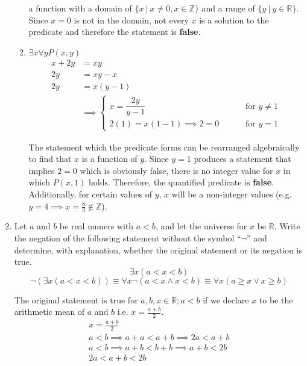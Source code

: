 \documentclass[letterpaper, 12pt]{article}
\newcommand{\keyword}[1]{\textbf{#1}}
\begin{document}
\begin{enumerate}
\begin{enumerate}
\begin{flushleft}
    a function with a domain of $\{x \: | \: x \ne 0, x \in \mathbb{Z}\}$ and a range of
    $\{y \: | \: y \in \mathbb{R}\}$. Since $x = 0$ is not in the domain, not every $x$ is a 
    solution to the predicate and therefore the statement is \keyword{false}.
\end{flushleft}
\item $\exists x \forall y P(x, y)$
\begin{align*}
    x + 2y &= xy \\
    2y &= xy - x \\
    2y &= x(y - 1) \\
    &\implies \begin{cases}
        x = \dfrac{2y}{y - 1} &\qquad \text{ for } y \ne 1 \\
        2(1) = x(1 - 1) \implies 2 = 0 &\qquad \text{ for } y = 1
    \end{cases}
\end{align*}
\begin{flushleft}
    The statement which the predicate forms can be rearranged algebraically to find that $x$ is
    a function of $y$. Since $y = 1$ produces a statement that implies $2 = 0$ which is obviously 
    false, there is no integer value for $x$ in which $P(x, 1)$ holds. Therefore, the quantified 
    predicate is \keyword{false}. Additionally, for certain values of $y$, $x$ will be a non-integer 
    values (e.g. $y = 4 \implies x = \frac{8}{3} \notin \mathbb{Z}$).
\end{flushleft}
\end{enumerate}
\item Let $a$ and $b$ be real numers with $a < b$, and let the universe for $x$ be $\mathbb{R}$. 
Write the negation of the following statement without the symbol ``$\neg$'' and determine, with 
explanation, whether the original statement or its negation is true.
\[\exists x (a < x < b)\]
\[\neg(\exists x (a < x < b)) \equiv \forall x \neg(a < x \wedge x < b) \equiv
\forall x (a \ge x \vee x \ge b)\]
\begin{flushleft}
    The original statement is true for $a, b, x \in \mathbb{R}; a < b$ if we declare $x$ 
    to be the arithmetic mean of $a$ and $b$ i.e. $x = \frac{a + b}{2}$.
\begin{gather*}
    x = \frac{a + b}{2} \\
    a < b \implies a + a < a + b \implies 2a < a + b \\
    a < b \implies a + b < b + b \implies a + b < 2b \\
    2a < a + b < 2b \\

\end{gather*}
\end{flushleft}
\end{enumerate}
\end{document}
